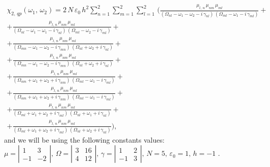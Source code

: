 \documentclass[12pt,twoside,a4paper]{article}
\numberwithin{equation}{subsection}
\numberwithin{figure}{subsection}
\begin{document}
\begin{multline} \label{eq:four_qp2}
  \chi_{2, \,qp}({\omega_{1}}, \,{\omega_{2}}) = 
   2\,N\,\varepsilon_{0}\,h^{2}\sum_{n=1}^{2}\sum_{m=1}^{2}\sum_{l=1}^{2}\,
  (      \frac {{\mu_{l,\,n}}\,{\mu_{nm}}\,{\mu_{ml}}}
      {({\Omega_{nl}} - \omega_1 - \omega_2 - i\,{\gamma_{nl}})\,({\Omega_{ml}} - \omega_1 - i\,{\gamma_{ml}})} 
  + \\ + \frac {{\mu_{l, \,n}}\,{\mu_{nm}}\,{\mu_{ml}}}
      {({\Omega_{nl}} - \omega_1 - \omega_1 - i\,{\gamma_{nl}})\,({\Omega_{ml}} - \omega_2 - i\,{\gamma_{ml}})}
  + \\ + \frac {{\mu_{l, \,n}}\,{\mu_{nm}}\,{\mu_{ml}}}
      {({\Omega_{mn}} - \omega_1 - \omega_2 - i\,{\gamma_{mn}})\,({\Omega_{nl}} + \omega_2 + i\,{\gamma_{nl}})}
  + \\ + \frac{{\mu_{l, \,n }}\,{\mu_{nm}}\,{\mu_{ml}}} 
      {({\Omega_{mn}} - \omega_1 - \omega_2 - i\,{\gamma_{mn}})\,({\Omega_{nl}} + \omega_2 + i\,{\gamma_{nl}})} 
  + \\ + \frac {{\mu_{l, \,n}}\,{\mu_{nm}}\,{\mu_{ml}}}
      {({\Omega_{nm}} + \omega_1 + \omega_2 + i\,{\gamma_{nm}})\,({\Omega_{ml}} - \omega_1 - i\,{\gamma_{ml}})}
  + \\ + \frac {{\mu_{l, \,n}}\,{\mu_{ nm}}\,{\mu_{ml}}}
      {({\Omega_{nm}} + \omega_1 + \omega_2 + i\,{\gamma_{nm}})\,({\Omega_{ml}} - \omega_1 - i\,{\gamma_{ml}})} 
  + \\ + \frac {{\mu_{l, \,n}}\,{\mu_{nm}}\,{\mu_{ml}}}
      {({\Omega_{ml}} + \omega_1 + \omega_2 + i\,{\gamma_{ml}})\,({\Omega_{nl}} + \omega_1 + i\,{\gamma_{nl}})}
  + \\ + \frac {{\mu_{l, \,n}}\,{\mu_{nm}}\,{\mu_{ml}}}
      {({\Omega_{ml}} + \omega_1 + \omega_2 + i\,{\gamma_{ml}})\,({\Omega_{nl}} + \omega_2 + i\,{\gamma_{nl}})}
  ) ,
\end{multline}
and we will be using the following constants values:
$\mu = \left| \begin{array}{cc} 
    1 & 3 \\ -1 & -2 
  \end{array} \right|,\, 
  \Omega = \left| \begin{array}{cc} 
    3 & 16 \\ 4 & 12 
  \end{array} \right|,\,
  \gamma = \left| \begin{array}{cc} 
  1 & 2 \\ -1 & 3
  \end{array} \right|,\, N=5,\, {\varepsilon_{0}}=1,\,h= - 1$ .
\end{document}

